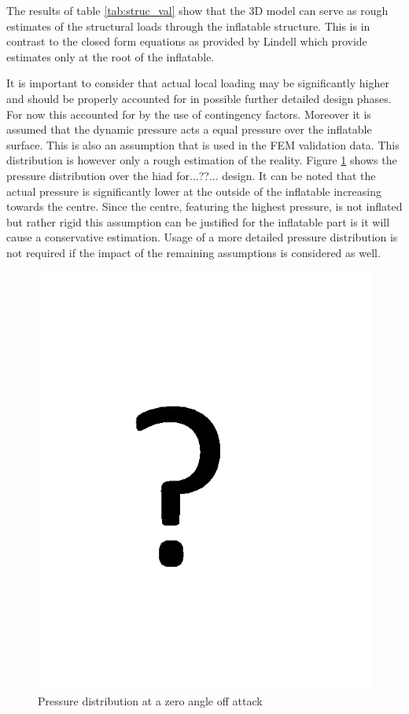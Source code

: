 The results of table \ref{tab:struc_val} show that the 3D model can serve as rough estimates of the structural loads through the inflatable structure. This is in contrast to the closed form equations as provided by Lindell\cite{Lindell2006} which provide estimates only at the root of the inflatable. 

It is important to consider that actual local loading may be significantly higher and should be properly accounted for in possible further detailed design phases. For now this accounted for by the use of contingency factors. Moreover it is assumed that the dynamic pressure acts a equal pressure over the inflatable surface. This is also an assumption that is used in the FEM validation data. This distribution is however only a rough estimation of the reality. Figure \ref{fig:struc_pres} shows the pressure distribution over the \gls{hiad} for...??... design. It can be noted that the actual pressure is significantly lower at the outside of the inflatable increasing towards the centre. Since the centre, featuring the highest pressure, is not inflated but rather rigid this assumption can be justified for the inflatable part is it will cause a conservative estimation. Usage of a more detailed pressure distribution is not required if the impact of the remaining assumptions is considered as well. 

\begin{figure}[b]
\centering
\includegraphics[width=1.0\textwidth]{./Figure/Structure/temp.png}
\caption{Pressure distribution at a zero angle off attack} 
\label{fig:struc_pres}
\end{figure}